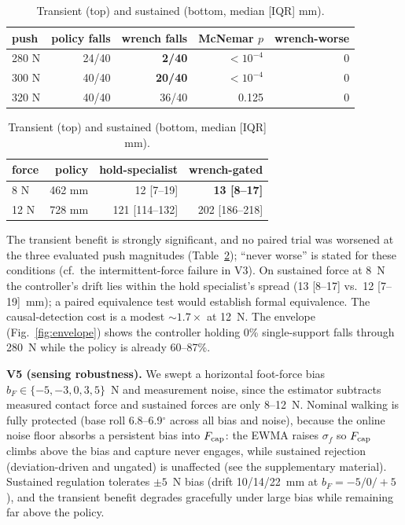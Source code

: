\documentclass[journal]{IEEEtran}
\begin{document}
\begin{table}[t]
\caption{Transient (top) and sustained (bottom, median [IQR] mm).}
\label{tab:stats}
\centering
\setlength{\tabcolsep}{4pt}
\begin{tabular}{lrrrr}
\hline
push & policy falls & wrench falls & McNemar $p$ & wrench-worse\\
\hline
280 N & 24/40 & \textbf{2/40} & $<10^{-4}$ & 0\\
300 N & 40/40 & \textbf{20/40} & $<10^{-4}$ & 0\\
320 N & 40/40 & 36/40 & 0.125 & 0\\
\hline
\end{tabular}

\vspace{4pt}

\begin{tabular}{lrrr}
\hline
force & policy & hold-specialist & wrench-gated\\
\hline
8 N & 462 mm & 12 [7--19] & \textbf{13 [8--17]}\\
12 N & 728 mm & 121 [114--132] & 202 [186--218]\\
\hline
\end{tabular}
\end{table}

The transient benefit is strongly significant, and no paired trial was worsened at the three evaluated push magnitudes (Table~\ref{tab:stats}); ``never worse'' is stated for these conditions (cf.\ the intermittent-force failure in V3). On sustained force at 8~N the controller's drift lies within the hold specialist's spread (13 [8--17] vs.\ 12 [7--19]~mm); a paired equivalence test would establish formal equivalence. The causal-detection cost is a modest $\sim 1.7\times$ at 12~N. The envelope (Fig.~\ref{fig:envelope}) shows the controller holding 0\% single-support falls through 280~N while the policy is already 60--87\%.

\textbf{V5 (sensing robustness).} We swept a horizontal foot-force bias $b_F\in\{-5,-3,0,3,5\}$~N and measurement noise, since the estimator subtracts measured contact force and sustained forces are only 8--12~N. Nominal walking is fully protected (base roll 6.8--6.9$^\circ$ across all bias and noise), because the online noise floor absorbs a persistent bias into $F_{\rm cap}$: the EWMA raises $\sigma_f$ so $F_{\rm cap}$ climbs above the bias and capture never engages, while sustained rejection (deviation-driven and ungated) is unaffected (see the supplementary material). Sustained regulation tolerates $\pm 5$~N bias (drift 10/14/22~mm at $b_F=-5/0/+5$), and the transient benefit degrades gracefully under large bias while remaining far above the policy.
\end{document}
